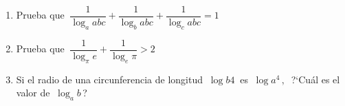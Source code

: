 \begin{enumerate}
\vspace{-6mm}
\begin{flushright}
\begin{footnotesize} \textcolor{gris}{}	\end{footnotesize}
\end{flushright}

\item Prueba que $\ \dfrac{1}{\log_aabc}+\dfrac{1}{\log_babc}+\dfrac{1}{\log_cabc}=1$

\vspace{-6mm}
\begin{flushright}
\begin{footnotesize} \textcolor{gris}{}	\end{footnotesize}
\end{flushright}

\item Prueba que $\ \dfrac{1}{\log_\pi e}+\dfrac{1}{\log_e \pi}>2$

\vspace{-6mm}
\begin{flushright}
\begin{footnotesize} \textcolor{gris}{}	\end{footnotesize}
\end{flushright}

\vspace{-8mm}
\begin{flushright}
\begin{footnotesize} \textcolor{gris}{}	\end{footnotesize}
\end{flushright}

\vspace{-8mm}
\begin{flushright}
\begin{footnotesize} \textcolor{gris}{}	\end{footnotesize}
\end{flushright}

\item Si el radio de una circunferencia de longitud  $\ \log b 4\ $ es $\ \log a^4\, , \ $ ?`Cuál es el valor de $\ \log_a b\, $?


\end{enumerate}
